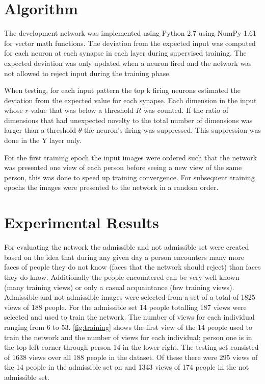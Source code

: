 \documentclass[conference]{IEEEtran}
\begin{document}
\section{Algorithm}
The development network was implemented using Python 2.7 using NumPy 1.61 for vector math functions.  The deviation from the expected input was computed for each neuron at each synapse in each layer during supervised training.  The expected deviation was only updated when a neuron fired and the network was not allowed to reject input during the training phase.

When testing, for each input pattern the top k firing neurons estimated the deviation from the expected value for each synapse.  Each dimension in the input whose $r$-value that was below a threshold $R$ was counted.  If the ratio of dimensions that had unexpected novelty to the total number of dimensions was larger than a threshold $\theta$ the neuron’s firing was suppressed.  This suppression was done in the Y layer only.

For the first training epoch the input images were ordered such that the network was presented one view of each person before seeing a new view of the same person, this was done to speed up training convergence.  For subsequent training epochs the images were presented to the network in a random order.

\section{Experimental Results}
For evaluating the network the admissible and not admissible set were created based on the idea that during any given day a person encounters many more faces of people they do not know (faces that the network should reject) than faces they do know.  Additionally the people encountered can be very well known (many training views) or only a casual acquaintance (few training views).  Admissible and not admissible images were selected from a set of a total of 1825 views of 188 people.  For the admissible set 14 people totalling 187 views were selected and used to train the network. The number of views for each individual ranging from 6 to 53. \ref{fig:training} shows the first view of the 14 people used to train the network and the number of views for each individual; person one is in the top left corner through person 14 in the lower right. The testing set consisted of 1638 views over all 188 people in the dataset.  Of these there were 295 views of the 14 people in the admissible set on and 1343 views of 174 people in the not admissible set.  
\end{document}
